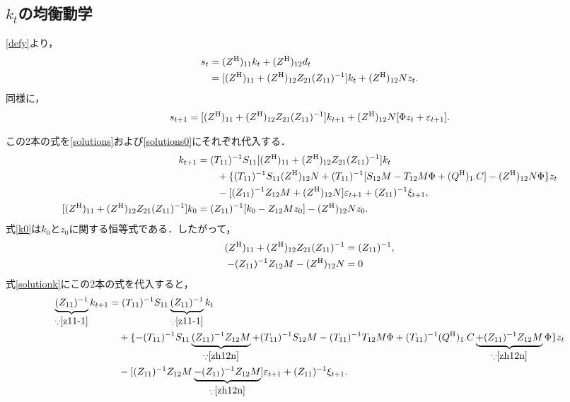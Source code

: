 \documentclass[a4j, dvipdfmx]{jarticle}
\begin{document}
\subsection{$k_t$の均衡動学}
\eqref{defy}より，
\begin{align*}
s_t &= (Z^{\rm{H}})_{11}k_t + (Z^{\rm{H}})_{12}d_t\notag\\
&= [(Z^{\rm{H}})_{11} + (Z^{\rm{H}})_{12}Z_{21}(Z_{11})^{-1}]k_t + (Z^{\rm{H}})_{12}Nz_t.
\end{align*}
同様に，
\begin{align*}
s_{t+1} = [(Z^{\rm{H}})_{11} + (Z^{\rm{H}})_{12}Z_{21}(Z_{11})^{-1}]k_{t+1} + (Z^{\rm{H}})_{12}N[\Phi z_t + \varepsilon_{t+1}].
\end{align*}

この2本の式を\eqref{solutions}および\eqref{solutions0}にそれぞれ代入する．
\begin{align}
[(Z^{\rm{H}})_{11} + (Z^{\rm{H}})_{12}Z_{21}(Z_{11})^{-1}]k_{t+1} &= (T_{11})^{-1}S_{11}[(Z^{\rm{H}})_{11} + (Z^{\rm{H}})_{12}Z_{21}(Z_{11})^{-1}]k_t \notag\\&\qquad+ \{(T_{11})^{-1}S_{11}(Z^{\rm{H}})_{12}N + (T_{11})^{-1}[S_{12}M - T_{12}M\Phi + (Q^{\rm{H}})_{1\cdot}C]-(Z^{\rm{H}})_{12}N\Phi\}z_t \notag\\
&\qquad -[(Z_{11})^{-1}Z_{12}M+(Z^{\rm{H}})_{12}N] \varepsilon_{t+1} + (Z_{11})^{-1}\xi_{t+1}, \label{solutionk}\\
[(Z^{\rm{H}})_{11} + (Z^{\rm{H}})_{12}Z_{21}(Z_{11})^{-1}]k_0&= (Z_{11})^{-1}[k_0 - Z_{12}Mz_0]-(Z^{\rm{H}})_{12}Nz_0. \label{k0}
\end{align}
式\eqref{k0}は$k_0$と$z_0$に関する恒等式である．したがって，
\begin{align}
(Z^{\rm{H}})_{11} + (Z^{\rm{H}})_{12}Z_{21}(Z_{11})^{-1} &= (Z_{11})^{-1}, \label{z11-1}\\
-(Z_{11})^{-1}Z_{12}M-(Z^{\rm{H}})_{12}N &= 0\label{zh12n}
\end{align}
式\eqref{solutionk}にこの2本の式を代入すると，
\begin{align*}
\underbrace{(Z_{11})^{-1}}_{\because \eqref{z11-1}}k_{t+1} &= (T_{11})^{-1}S_{11}\underbrace{(Z_{11})^{-1}}_{\because \eqref{z11-1}}k_t\notag\\
&\quad +\{-(T_{11})^{-1}S_{11}\underbrace{(Z_{11})^{-1}Z_{12}M}_{\because \eqref{zh12n}} + (T_{11})^{-1}S_{12}M-(T_{11})^{-1}T_{12}M\Phi + (T_{11})^{-1}(Q^{\rm{H}})_{1\cdot}C\underbrace{+(Z_{11})^{-1}Z_{12}M}_{\because \eqref{zh12n}}\Phi\}z_t\notag\\
&\quad -[(Z_{11})^{-1}Z_{12}M \underbrace{-(Z_{11})^{-1}Z_{12}M}_{\because \eqref{zh12n}}]\varepsilon_{t+1} + (Z_{11})^{-1}\xi_{t+1}.
\end{align*}
\end{document}
